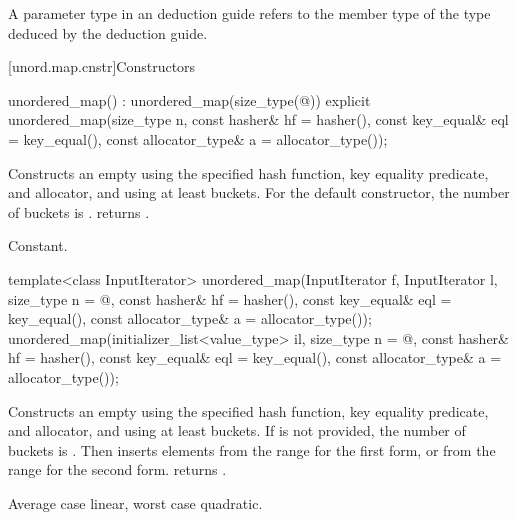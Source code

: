 \pnum
A  parameter type in an  deduction guide
refers to the  member type of the type deduced by the deduction guide.

[unord.map.cnstr]{Constructors}

%
\begin{itemdecl}
unordered_map() : unordered_map(size_type(@\seebelow@)) { }
explicit unordered_map(size_type n,
                       const hasher& hf = hasher(),
                       const key_equal& eql = key_equal(),
                       const allocator_type& a = allocator_type());
\end{itemdecl}

\begin{itemdescr}
\pnum
\effects Constructs an empty  using the
specified hash function, key equality predicate, and allocator, and
using at least  buckets.  For the default constructor,
the number of buckets is .
 returns .

\pnum
\complexity Constant.
\end{itemdescr}

%
\begin{itemdecl}
template<class InputIterator>
  unordered_map(InputIterator f, InputIterator l,
                size_type n = @\seebelow@,
                const hasher& hf = hasher(),
                const key_equal& eql = key_equal(),
                const allocator_type& a = allocator_type());
unordered_map(initializer_list<value_type> il,
              size_type n = @\seebelow@,
              const hasher& hf = hasher(),
              const key_equal& eql = key_equal(),
              const allocator_type& a = allocator_type());
\end{itemdecl}

\begin{itemdescr}
\pnum
\effects Constructs an empty  using the
specified hash function, key equality predicate, and allocator, and
using at least  buckets. If  is not
provided, the number of buckets is . Then
inserts elements from the range 
for the first form, or from the range
 for the second form.
 returns .

\pnum
\complexity Average case linear, worst case quadratic.
\end{itemdescr}

